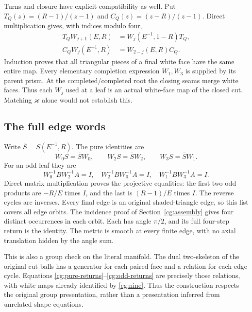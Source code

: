 Turns and closure have explicit compatibility as well.
Put $T_Q(z)=(R-1)/(z-1)$ and $C_Q(z)=(z-R)/(z-1)$.
Direct multiplication gives, with indices modulo four,
\begin{equation}\label{cg:turn-closing}
\begin{split}
 T_QW_{j+1}(E,R)&=W_j(E^{-1},1-R)T_Q,\\
 C_QW_j(E^{-1},R)&=W_{2-j}(E,R)C_Q.
\end{split}
\end{equation}
Induction proves that all triangular pieces of a final white face
have the same entire map. Every elementary completion expression
$W_1,W_3$ is supplied by its parent prism. At the
completed/completed root the closing seams merge white faces.
Thus each $W_j$ used at a leaf is an actual white-face map of the
closed cut. Matching $\varkappa$ alone would not establish this.

\subsection{The full edge words}
Write $\overline S=S(E^{-1},R)$. The pure identities are
\begin{equation}\label{cg:pure-returns}
 W_0S=\overline S W_0,\qquad
 W_2S=\overline S W_2,\qquad
 W_3S=\overline S W_1 .
\end{equation}
For an odd leaf they are
\begin{equation}\label{cg:odd-returns}
 W_0^{-1}BW_2^{-1}A=I,\quad
 W_2^{-1}BW_0^{-1}A=I,\quad
 W_1^{-1}BW_3^{-1}A=I .
\end{equation}
Direct matrix multiplication proves the projective equalities:
the first two odd products are $-R/E$ times $I$, and the last
is $(R-1)/E$ times $I$. The reverse cycles are inverses.
Every final edge is an original shaded-triangle edge, so this
list covers all edge orbits. The incidence proof of
Section~\ref{cg:assembly} gives four distinct occurrences in each
orbit. Each has angle $\pi/2$, and its full four-step return is
the identity. The metric is smooth at every finite edge, with
no axial translation hidden by the angle sum.

This is also a group check on the literal manifold. The dual
two-skeleton of the original cut balls has a generator for each
paired face and a relation for each edge cycle. Equations
\eqref{cg:pure-returns}--\eqref{cg:odd-returns} are precisely those
relations, with white maps already identified by \eqref{cg:nine}.
Thus the construction respects the original group presentation,
rather than a presentation inferred from unrelated shape equations.
